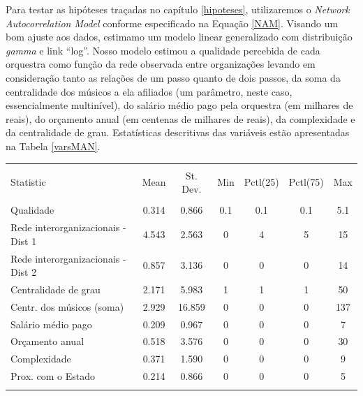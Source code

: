 \documentclass[a4paper, 12pt, openright, oneside, german, french, english, brazil]{abntex2}
\begin{document}
	Para testar as hipóteses traçadas no capítulo \ref{hipoteses}, utilizaremos o \textit{Network Autocorrelation Model} conforme especificado na Equação \ref{NAM}. Visando um bom ajuste aos dados, estimamo um modelo linear generalizado com distribuição \textit{gamma} e link ``log''. Nosso modelo estimou a qualidade percebida de cada orquestra como função da rede observada entre organizações levando em consideração tanto as relações de um passo quanto de dois passos, da soma da centralidade dos músicos a ela afiliados (um parâmetro, neste caso, essencialmente multinível), do salário médio pago pela orquestra (em milhares de reais), do orçamento anual (em centenas de milhares de reais), da complexidade
	e da centralidade de grau.	
	Estatísticas descritivas das variáveis estão apresentadas na Tabela \ref{varsMAN}.
	
	\begin{table}[!htbp] 
		{\begin{tabular}{@{\extracolsep{5pt}}lcccccc} 
			\\[-1.8ex]\hline 
			\hline \\[-1.8ex] 
			Statistic &  \multicolumn{1}{c}{Mean} & \multicolumn{1}{c}{St. Dev.} & \multicolumn{1}{c}{Min} & \multicolumn{1}{c}{Pctl(25)} & \multicolumn{1}{c}{Pctl(75)} & \multicolumn{1}{c}{Max} \\ 
			\hline \\[-1.8ex] 
			Qualidade &  0.314 & 0.866 & 0.1 & 0.1 & 0.1 & 5.1 \\ 
			Rede interorganizacionais - Dist 1  & 4.543 & 2.563 & 0 & 4 & 5 & 15 \\ 
			Rede interorganizacionais - Dist 2  & 0.857 & 3.136 & 0 & 0 & 0 & 14 \\ 
			Centralidade de grau & 2.171 & 5.983 & 1 & 1 & 1 & 50 \\ 
			Centr. dos músicos (soma) & 2.929 & 16.859 & 0 & 0 & 0 & 137 \\ 
			Salário médio pago & 0.209 & 0.967 & 0 & 0 & 0 & 7 \\ 
			Orçamento anual & 0.518 & 3.576 & 0 & 0 & 0 & 30 \\ 
			Complexidade & 0.371 & 1.590 & 0 & 0 & 0 & 9 \\
			Prox. com o Estado & 0.214 & 0.866 & 0 & 0 & 0 & 5 \\ 
			\hline \\[-1.8ex] 
		\end{tabular}
	}
	{}
	\end{table} 
\end{document}
